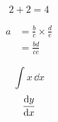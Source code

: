 
\usepackage{amsmath}
\usepackage{physics}


\begin{equation}
    2 + 2 = 4
\end{equation}

\begin{align}
    a & = \frac{b}{c} \times \frac{d}{e} \\
    & = \frac{bd}{ce}
\end{align}


\begin{equation*}
    \int x\,\dd{x}
\end{equation*}
\begin{equation*}
    \dv{y}{x}
\end{equation*}
